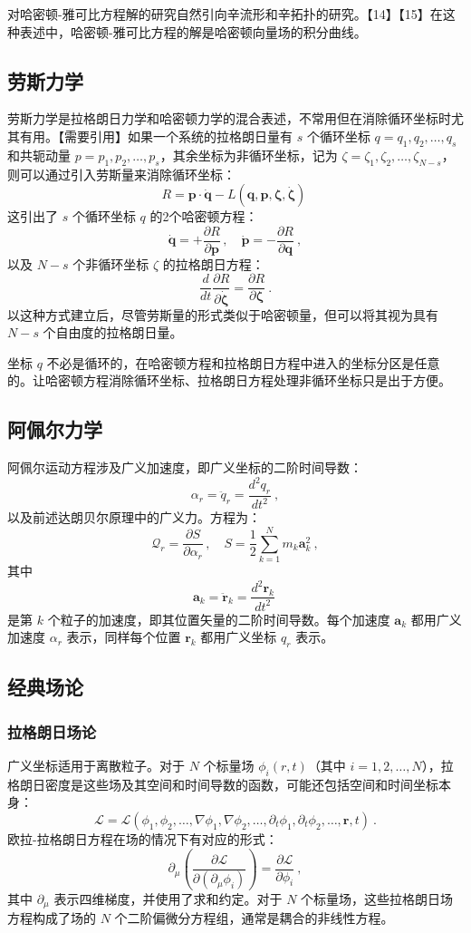 对哈密顿-雅可比方程解的研究自然引向辛流形和辛拓扑的研究。【14】【15】在这种表述中，哈密顿-雅可比方程的解是哈密顿向量场的积分曲线。
\subsection{劳斯力学}  
劳斯力学是拉格朗日力学和哈密顿力学的混合表述，不常用但在消除循环坐标时尤其有用。【需要引用】如果一个系统的拉格朗日量有 \( s \) 个循环坐标 \( q = q_1, q_2, \dots, q_s \) 和共轭动量 \( p = p_1, p_2, \dots, p_s \)，其余坐标为非循环坐标，记为 \( \zeta = \zeta_1, \zeta_2, \dots, \zeta_{N - s} \)，则可以通过引入劳斯量来消除循环坐标：
\[
R = \mathbf{p} \cdot \mathbf{\dot{q}} - L(\mathbf{q}, \mathbf{p}, \boldsymbol{\zeta}, \dot{\boldsymbol{\zeta}})~
\]
这引出了 \( s \) 个循环坐标 \( q \) 的2个哈密顿方程：
\[
\dot{\mathbf{q}} = +\frac{\partial R}{\partial \mathbf{p}} \,, \quad \dot{\mathbf{p}} = -\frac{\partial R}{\partial \mathbf{q}} ~,
\]
以及 \( N - s \) 个非循环坐标 \( \zeta \) 的拉格朗日方程：
\[
\frac{d}{dt} \frac{\partial R}{\partial \dot{\boldsymbol{\zeta}}} = \frac{\partial R}{\partial \boldsymbol{\zeta}} ~.
\]
以这种方式建立后，尽管劳斯量的形式类似于哈密顿量，但可以将其视为具有 \( N - s \) 个自由度的拉格朗日量。

坐标 \( q \) 不必是循环的，在哈密顿方程和拉格朗日方程中进入的坐标分区是任意的。让哈密顿方程消除循环坐标、拉格朗日方程处理非循环坐标只是出于方便。
\subsection{阿佩尔力学}   
阿佩尔运动方程涉及广义加速度，即广义坐标的二阶时间导数：
\[
\alpha_r = \ddot{q}_r = \frac{d^2 q_r}{dt^2} ~,
\]
以及前述达朗贝尔原理中的广义力。方程为：
\[
\mathcal{Q}_r = \frac{\partial S}{\partial \alpha_r} \,, \quad S = \frac{1}{2} \sum_{k=1}^{N} m_k \mathbf{a}_k^2 ~,
\]
其中
\[
\mathbf{a}_k = \ddot{\mathbf{r}}_k = \frac{d^2 \mathbf{r}_k}{dt^2}~
\]
是第 \( k \) 个粒子的加速度，即其位置矢量的二阶时间导数。每个加速度 \( \mathbf{a}_k \) 都用广义加速度 \( \alpha_r \) 表示，同样每个位置 \( \mathbf{r}_k \) 都用广义坐标 \( q_r \) 表示。
\subsection{经典场论}  
\subsubsection{拉格朗日场论}  
广义坐标适用于离散粒子。对于 \( N \) 个标量场 \( \phi_i(r, t) \)（其中 \( i = 1, 2, \dots, N \)），拉格朗日密度是这些场及其空间和时间导数的函数，可能还包括空间和时间坐标本身：
\[
\mathcal{L} = \mathcal{L}(\phi_1, \phi_2, \dots, \nabla \phi_1, \nabla \phi_2, \dots, \partial_t \phi_1, \partial_t \phi_2, \dots, \mathbf{r}, t) ~.
\]
欧拉-拉格朗日方程在场的情况下有对应的形式：
\[
\partial_\mu \left( \frac{\partial \mathcal{L}}{\partial (\partial_\mu \phi_i)} \right) = \frac{\partial \mathcal{L}}{\partial \phi_i} ~,
\]
其中 \( \partial_\mu \) 表示四维梯度，并使用了求和约定。对于 \( N \) 个标量场，这些拉格朗日场方程构成了场的 \( N \) 个二阶偏微分方程组，通常是耦合的非线性方程。

